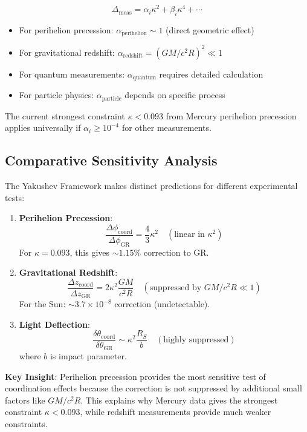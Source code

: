 \documentclass[11pt,a4paper]{article}
\begin{document}
	\begin{equation}
		\Delta_{\text{meas}} = \alpha_i \kappa^2 + \beta_i \kappa^4 + \cdots
	\end{equation}
	
	\begin{itemize}
		\item For perihelion precession: $\alpha_{\text{perihelion}} \sim 1$ (direct geometric effect)
		\item For gravitational redshift: $\alpha_{\text{redshift}} = (GM/c^2R)^2 \ll 1$
		\item For quantum measurements: $\alpha_{\text{quantum}}$ requires detailed calculation
		\item For particle physics: $\alpha_{\text{particle}}$ depends on specific process
	\end{itemize}
	
	The current strongest constraint $\kappa < 0.093$ from Mercury perihelion precession applies universally if $\alpha_i \geq 10^{-4}$ for other measurements.
	
	\subsection{Comparative Sensitivity Analysis}
	\label{subsec:comparative-sensitivity}
	
	The Yakushev Framework makes distinct predictions for different experimental tests:
	
	\begin{enumerate}
		\item \textbf{Perihelion Precession}: 
		\[
		\frac{\Delta\phi_{\text{coord}}}{\Delta\phi_{\text{GR}}} = \frac{4}{3}\kappa^2 \quad (\text{linear in }\kappa^2)
		\]
		For $\kappa = 0.093$, this gives $\sim 1.15\%$ correction to GR.
		
		\item \textbf{Gravitational Redshift}:
		\[
		\frac{\Delta z_{\text{coord}}}{\Delta z_{\text{GR}}} = 2\kappa^2 \frac{GM}{c^2R} \quad (\text{suppressed by }GM/c^2R \ll 1)
		\]
		For the Sun: $\sim 3.7\times10^{-8}$ correction (undetectable).
		
		\item \textbf{Light Deflection}:
		\[
		\frac{\delta\theta_{\text{coord}}}{\delta\theta_{\text{GR}}} \sim \kappa^2 \frac{R_S}{b} \quad (\text{highly suppressed})
		\]
		where $b$ is impact parameter.
	\end{enumerate}
	
	\textbf{Key Insight}: Perihelion precession provides the most sensitive test of coordination effects because the correction is not suppressed by additional small factors like $GM/c^2R$. This explains why Mercury data gives the strongest constraint $\kappa < 0.093$, while redshift measurements provide much weaker constraints.
	
\end{document}
